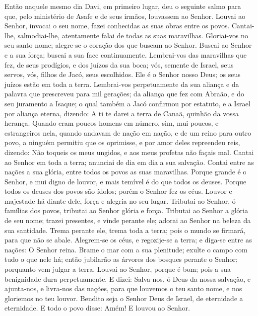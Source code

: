 Então naquele mesmo dia Davi, em primeiro lugar, deu o seguinte
salmo para que, pelo ministério de Asafe e de seus irmãos, louvassem
ao Senhor. Louvai ao Senhor, invocai o seu nome, fazei
conhecidas as suas obras entre os povos. Cantai-lhe,
salmodiai-lhe, atentamente falai de todas as suas maravilhas.
Gloriai-vos no seu santo nome; alegre-se o coração dos que
buscam ao Senhor. Buscai ao Senhor e a sua força; buscai a
sua face continuamente. Lembrai-vos das maravilhas que fez,
de seus prodígios, e dos juízos da sua boca; vós, semente de
Israel, seus servos, vós, filhos de Jacó, seus escolhidos.
Ele é o Senhor nosso Deus; os seus juízos estão em toda a
terra. Lembrai-vos perpetuamente da sua aliança e da palavra
que prescreveu para mil gerações; da aliança que fez com
Abraão, e do seu juramento a Isaque; o qual também a Jacó
confirmou por estatuto, e a Israel por aliança eterna,
dizendo: A ti te darei a terra de Canaã, quinhão da vossa
herança. Quando eram poucos homens em número, sim, mui
poucos, e estrangeiros nela, quando andavam de nação em
nação, e de um reino para outro povo, a ninguém permitiu que
os oprimisse, e por amor deles repreendeu reis, dizendo: Não
toqueis os meus ungidos, e aos meus profetas não façais mal.
Cantai ao Senhor em toda a terra; anunciai de dia em dia a
sua salvação. Contai entre as nações a sua glória, entre
todos os povos as suas maravilhas. Porque grande é o Senhor,
e mui digno de louvor, e mais temível é do que todos os deuses.
Porque todos os deuses dos povos são ídolos; porém o Senhor
fez os céus. Louvor e majestade há diante dele, força e
alegria no seu lugar. Tributai ao Senhor, ó famílias dos
povos, tributai ao Senhor glória e força. Tributai ao Senhor
a glória de seu nome; trazei presentes, e vinde perante ele; adorai
ao Senhor na beleza da sua santidade. Trema perante ele,
trema toda a terra; pois o mundo se firmará, para que não se abale.
Alegrem-se os céus, e regozije-se a terra; e diga-se entre as
nações: O Senhor reina. Brame o mar com a sua plenitude;
exulte o campo com tudo o que nele há; então jubilarão as
árvores dos bosques perante o Senhor; porquanto vem julgar a terra.
Louvai ao Senhor, porque é bom; pois a sua benignidade dura
perpetuamente. E dizei: Salva-nos, ó Deus da nossa salvação,
e ajunta-nos, e livra-nos das nações, para que louvemos o teu santo
nome, e nos gloriemos no teu louvor. Bendito seja o Senhor
Deus de Israel, de eternidade a eternidade. E todo o povo disse:
Amém! E louvou ao Senhor.

